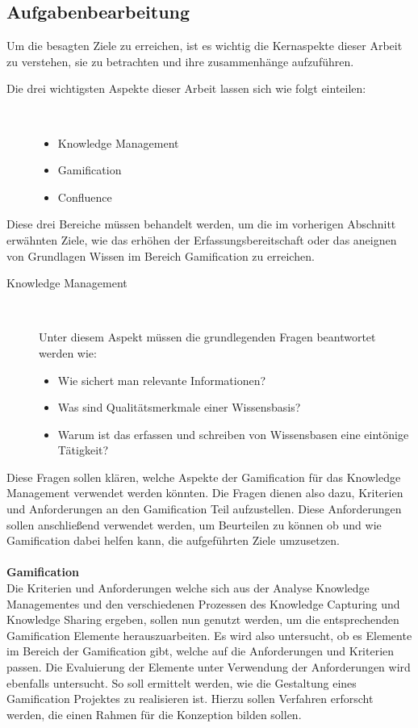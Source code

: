 \documentclass[a4paper,12pt,twoside]{scrartcl}
\begin{document}
\subsection{Aufgabenbearbeitung} 
Um die besagten Ziele zu erreichen, ist es wichtig die Kernaspekte dieser Arbeit zu verstehen, sie zu betrachten und ihre zusammenhänge aufzuführen.
\begin{description}
   \item[Die drei wichtigsten Aspekte dieser Arbeit lassen sich wie folgt einteilen:]~\par
   \begin{itemize}
      \item Knowledge Management
      \item Gamification
      \item Confluence
   \end{itemize}
\end{description}
Diese drei Bereiche müssen behandelt werden, um die im vorherigen Abschnitt erwähnten Ziele, wie das erhöhen der Erfassungsbereitschaft oder das aneignen von Grundlagen Wissen im Bereich Gamification zu erreichen.
\begin{description}
   \item[Knowledge Management]~\par
Unter diesem Aspekt müssen die grundlegenden Fragen beantwortet werden wie:
   \begin{itemize}
      \item Wie sichert man relevante Informationen?
      \item Was sind Qualitätsmerkmale einer Wissensbasis?
      \item Warum ist das erfassen und schreiben von Wissensbasen eine eintönige Tätigkeit?
   \end{itemize}
\end{description}
Diese Fragen sollen klären, welche Aspekte der Gamification für das Knowledge Management verwendet werden könnten. Die Fragen dienen also dazu, Kriterien und Anforderungen an den Gamification Teil aufzustellen. Diese Anforderungen sollen anschließend verwendet werden, um Beurteilen zu können ob und wie Gamification dabei helfen kann, die aufgeführten Ziele umzusetzen.
\\\\
\textbf{Gamification}\\
Die Kriterien und Anforderungen welche sich aus der Analyse Knowledge Managementes und den verschiedenen Prozessen des Knowledge Capturing und Knowledge Sharing ergeben, sollen nun genutzt werden, um die entsprechenden Gamification Elemente herauszuarbeiten. Es wird also untersucht, ob es Elemente im Bereich der Gamification gibt, welche auf die Anforderungen und Kriterien passen. Die Evaluierung der Elemente unter Verwendung der Anforderungen wird ebenfalls untersucht. So soll ermittelt werden, wie die Gestaltung eines Gamification Projektes zu realisieren ist. Hierzu sollen Verfahren erforscht werden, die einen Rahmen für die Konzeption bilden sollen. 
\end{document}
